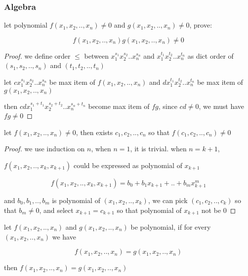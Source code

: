 \subsubsection{Algebra}

\begin{exercise}
    let polynomial $f(x_1,x_2,..,x_n) \ne 0$ and $g(x_1,x_2,..,x_n) \ne 0$, prove: 
    

    \[
    f(x_1,x_2,..,x_n)g(x_1,x_2,..,x_n) \ne 0
    \]
\end{exercise}

\begin{proof}
    we define order $\le$ between $x_1^{s_1}x_2^{s_2}..x_n^{s_n}$ and $x_1^{t_1}x_2^{t_2}..x_n^{t_n}$ as
    dict order of $(s_1,s_2,..,s_n)$ and $(t_1,t_2,..,t_n)$




    let $cx_1^{s_1}x_2^{s_2}..x_n^{s_n}$ be max item of $f(x_1,x_2,..,x_n)$
    and $dx_1^{t_1}x_2^{t_2}..x_n^{t_n}$ be max item of $g(x_1,x_2,..,x_n)$

    then $cdx_1^{s_1+t_1}x_2^{s_2+t_2}..x_n^{s_n+t_n}$ become max item of $f g$, since $cd \ne 0$, we must have $fg \ne 0$
\end{proof}

\begin{exercise}
    let $f(x_1,x_2,..,x_n) \ne 0$, then exists $c_1,c_2,..,c_n$ so that $f(c_1,c_2,..,c_n) \ne 0$
\end{exercise}

\begin{proof}
    we use induction on $n$, when $n=1$, it is trivial. when $n=k+1$, 

    $f(x_1,x_2,..,x_k,x_{k+1})$ could be expressed as polynomial of $x_{k+1}$

    \[
        f(x_1,x_2,..,x_k,x_{k+1}) = b_0 + b_1x_{k+1} + .. + b_mx_{k+1}^m
    \]

    and $b_0, b_1,..,b_m$ is polynomial of $(x_1,x_2,..,x_k)$, we can pick $(c_1,c_2,..,c_k)$
    so that $b_m \ne 0$, and select $x_{k+1} = c_{k+1}$ so that polynomial of $x_{k+1}$ not be $0$
\end{proof}

\begin{exercise}
    let $f(x_1,x_2,..,x_n)$ and $g(x_1,x_2,..,x_n)$ be polynomial, if for every $(x_1,x_2,..,x_n)$ we have

    \[
        f(x_1,x_2,..,x_n) = g(x_1,x_2,..,x_n)
    \]

    then $f(x_1,x_2,..,x_n) = g(x_1,x_2,..,x_n)$
\end{exercise}

